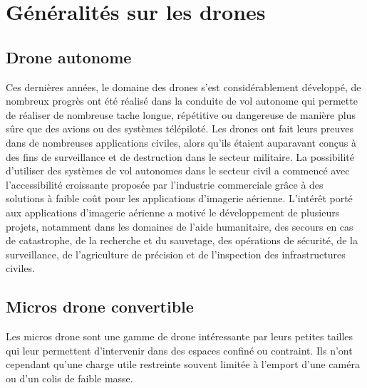 \chapter{Généralités sur les drones}


\section{Drone autonome}
Ces dernières années, le domaine des drones s'est considérablement développé, de nombreux progrès ont été réalisé dans la conduite de vol autonome qui permette de réaliser de nombreuse tache longue, répétitive ou dangereuse de manière plus sûre que des avions ou des systèmes télépiloté. Les drones ont fait leurs preuves dans de nombreuses applications civiles, alors qu'ils étaient auparavant conçus à des fins de surveillance et de destruction dans le secteur militaire. La possibilité d'utiliser des systèmes de vol autonomes dans le secteur civil a commencé avec l'accessibilité croissante proposée par l'industrie commerciale grâce à des solutions à faible coût pour les applications d'imagerie aérienne. L'intérêt porté aux applications d'imagerie aérienne a motivé le développement de plusieurs projets, notamment dans les domaines de l'aide humanitaire, des secours en cas de catastrophe, de la recherche et du sauvetage, des opérations de sécurité, de la surveillance, de l'agriculture de précision et de l'inspection des infrastructures civiles.

\section{Micros drone convertible}
Les micros drone sont une gamme de drone intéressante par leurs petites tailles qui leur permettent d'intervenir dans des espaces confiné ou contraint. Ils n'ont cependant qu'une charge utile restreinte souvent limitée à l'emport d'une caméra ou d'un colis de faible masse. 
